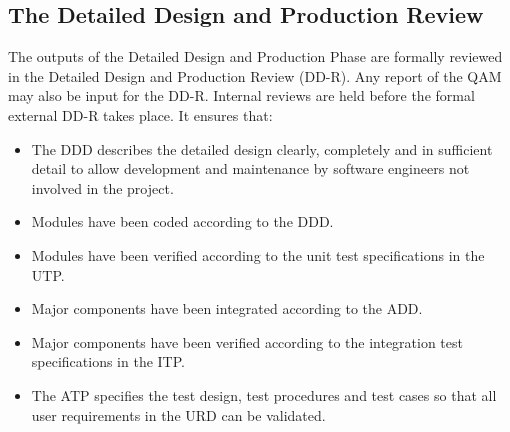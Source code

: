 \subsection{The Detailed Design and Production Review}
The outputs of the Detailed Design and Production Phase are formally reviewed in the Detailed Design and Production Review (DD-R). Any report of the QAM may also be input for the DD-R. Internal reviews are held before the formal external DD-R takes place. It ensures that:
\begin{itemize}
	\item The DDD describes the detailed design clearly, completely and in sufficient detail to allow development and maintenance by software engineers not involved in the project.
	\item  Modules have been coded according to the DDD.
	\item Modules have been verified according to the unit test specifications in the UTP.
	\item Major components have been integrated according to the ADD.
	\item Major components have been verified according to the integration test specifications in the ITP.
	\item The ATP specifies the test design, test procedures and test cases so that all user requirements in the URD can be validated.
\end{itemize}